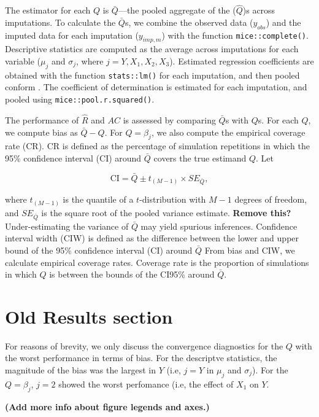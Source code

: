 \documentclass[Royal,times,sageh]{sagej}
\begin{document}
The estimator for each \(Q\) is \(\bar{Q}\)---the pooled aggregate of
the (\(\hat{Q}\))s across imputations. To calculate the \(\bar{Q}\)s, we
combine the observed data (\(y_{obs}\)) and the imputed data for each
imputation (\(y_{imp,m}\)) with the function \texttt{mice::complete()}.
Descriptive statistics are computed as the average across imputations
for each variable (\(\mu_j\) and \(\sigma_j\), where
\(j = Y, X_1, X_2, X_3\)). Estimated regression coefficients are
obtained with the function \texttt{stats::lm()} for each imputation, and
then pooled conform \citet{vink14}. The coefficient of determination is
estimated for each imputation, and pooled using
\texttt{mice::pool.r.squared()}.

The performance of \(\widehat{R}\) and \(AC\) is assessed by comparing
\(\bar{Q}\)s with \(Q\)s. For each \(Q\), we compute bias as
\(\bar{Q} - Q\). For \(Q=\beta_j\), we also compute the empirical
coverage rate (CR). CR is defined as the percentage of simulation
repetitions in which the 95\% confidence interval (CI) around
\(\bar{Q}\) covers the true estimand \(Q\). Let

\[\text{CI} = \bar{Q} \pm t_{(M-1)} \times SE_{\bar{Q}},\]

where \(t_{(M-1)}\) is the quantile of a \(t\)-distribution with \(M-1\)
degrees of freedom, and \(SE_{\bar{Q}}\) is the square root of the
pooled variance estimate. \textbf{Remove this? } Under-estimating the
variance of \(\bar{Q}\) may yield spurious inferences. Confidence
interval width (CIW) is defined as the difference between the lower and
upper bound of the 95\% confidence interval (CI) around \(\bar{Q}\) From
bias and CIW, we calculate empirical coverage rates. Coverage rate is
the proportion of simulations in which \(Q\) is between the bounds of
the CI95\% around \(\bar{Q}\).

\hypertarget{old-results-section}{%
\section{Old Results section}\label{old-results-section}}

For reasons of brevity, we only discuss the convergence diagnostics for
the \(Q\) with the worst performance in terms of bias. For the
descriptve statistics, the magnitude of the bias was the largest in
\(Y\) (i.e, \(j = Y\) in \(\mu_j\) and \(\sigma_j\)). For the
\(Q=\beta_j\), \(j=2\) showed the worst perfomance (i.e, the effect of
\(X_1\) on \(Y\).

\textbf{(Add more info about figure legends and axes.)}
\end{document}
